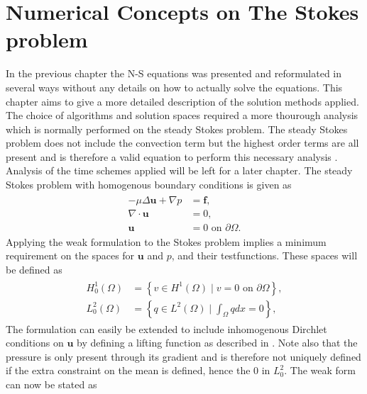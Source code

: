


\section{Numerical Concepts on The Stokes problem}
In the previous chapter the N-S equations was presented and reformulated in several ways without any details on how to
actually solve the equations. This chapter aims to give a more detailed description of the solution methods applied.
The choice of algorithms and solution spaces required a more thourough analysis which is normally performed on the 
steady Stokes problem. The steady Stokes problem does not include the convection term but the highest order terms are all present
and is therefore a valid equation to perform this necessary analysis \cite{Karniadakis}. Analysis of the time schemes applied
will be left for a later chapter. The steady Stokes problem with homogenous boundary conditions is given as 
%
\begin{align}
    \begin{split}
        - \mu \Delta \mathbf{u} + \nabla p &= \mathbf{f}, \\
        \nabla \cdot \mathbf{u} &= 0, \\
        \mathbf{u} &= 0 \text{  on  } \partial \Omega.
    \end{split}
    \label{eq:stokes}
\end{align}
%
Applying the weak formulation to the Stokes problem implies a minimum requirement on the spaces for $\mathbf{u}$ and $p$,
and their testfunctions. These spaces will be defined as 
%
\begin{align}
    \begin{split}
    H_0^1(\Omega) &= \left\{ v \in H^1(\Omega)\; |\; v = 0 \text{  on  } \partial \Omega \right\},\\
    L_0^2(\Omega) &= \left\{ q \in L^2(\Omega)\; |\; \int_{\Omega} q dx = 0 \right\},
    \end{split}
    \label{eq:spaces}
\end{align}
%
The formulation can easily be extended to include inhomogenous Dirchlet conditions on $\mathbf{u}$ by defining a 
lifting function as described in \cite{Quarteroni}. Note also that the pressure is only present through its gradient 
and is therefore not uniquely defined if the extra constraint on the mean is defined, hence the $0$ in $L_0^2$. 
The weak form can now be stated as

